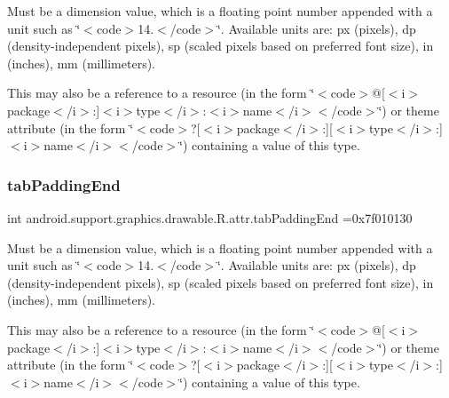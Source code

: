 Must be a dimension value, which is a floating point number appended with a unit such as \char`\"{}$<$code$>$14.\+5sp$<$/code$>$\char`\"{}. Available units are\+: px (pixels), dp (density-\/independent pixels), sp (scaled pixels based on preferred font size), in (inches), mm (millimeters). 

This may also be a reference to a resource (in the form \char`\"{}$<$code$>$@\mbox{[}$<$i$>$package$<$/i$>$\+:\mbox{]}$<$i$>$type$<$/i$>$\+:$<$i$>$name$<$/i$>$$<$/code$>$\char`\"{}) or theme attribute (in the form \char`\"{}$<$code$>$?\mbox{[}$<$i$>$package$<$/i$>$\+:\mbox{]}\mbox{[}$<$i$>$type$<$/i$>$\+:\mbox{]}$<$i$>$name$<$/i$>$$<$/code$>$\char`\"{}) containing a value of this type. \mbox{\label{classandroid_1_1support_1_1graphics_1_1drawable_1_1R_1_1attr_a3e0d531c1c2dbbcffc5c21d76e2228f3}} 
\subsubsection{\texorpdfstring{tab\+Padding\+End}{tabPaddingEnd}}
{\footnotesize\ttfamily int android.\+support.\+graphics.\+drawable.\+R.\+attr.\+tab\+Padding\+End =0x7f010130\hspace{0.3cm}{\ttfamily [static]}}

Must be a dimension value, which is a floating point number appended with a unit such as \char`\"{}$<$code$>$14.\+5sp$<$/code$>$\char`\"{}. Available units are\+: px (pixels), dp (density-\/independent pixels), sp (scaled pixels based on preferred font size), in (inches), mm (millimeters). 

This may also be a reference to a resource (in the form \char`\"{}$<$code$>$@\mbox{[}$<$i$>$package$<$/i$>$\+:\mbox{]}$<$i$>$type$<$/i$>$\+:$<$i$>$name$<$/i$>$$<$/code$>$\char`\"{}) or theme attribute (in the form \char`\"{}$<$code$>$?\mbox{[}$<$i$>$package$<$/i$>$\+:\mbox{]}\mbox{[}$<$i$>$type$<$/i$>$\+:\mbox{]}$<$i$>$name$<$/i$>$$<$/code$>$\char`\"{}) containing a value of this type. \mbox{\label{classandroid_1_1support_1_1graphics_1_1drawable_1_1R_1_1attr_a0e6b87cd6e9cb402a00bdd2ae909c2bb}} 
